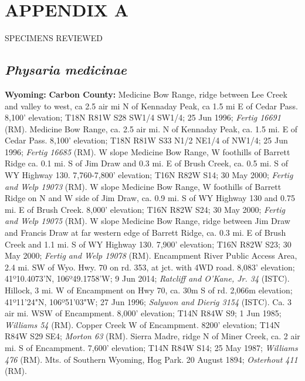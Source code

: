 \chapter*{APPENDIX A}
\begin{center}
SPECIMENS REVIEWED
\end{center}

\section*{\textit{Physaria medicinae}}

  \textbf{Wyoming:}
  \textbf{Carbon County:}
Medicine Bow Range, ridge between Lee Creek and valley to west, ca 2.5 air mi N
of Kennaday Peak, ca 1.5 mi E of Cedar Pass. 8,100' elevation; T18N R81W S28
SW1/4 SW1/4; 25 Jun 1996; \textit{Fertig 16691} (RM).
Medicine Bow Range, ca. 2.5 air mi. N of Kennaday Peak, ca. 1.5 mi. E of
Cedar Pass. 8,100’ elevation; T18N R81W S33 N1/2 NE1/4 of NW1/4; 25 Jun 1996;
\textit{Fertig 16685} (RM).
W slope Medicine Bow Range, W foothills of Barrett Ridge ca. 0.1 mi. S of
Jim Draw and 0.3 mi. E of Brush Creek, ca. 0.5 mi. S of WY Highway 130.
7,760-7,800’ elevation; T16N R82W S14; 30 May 2000;
\textit{Fertig and Welp 19073} (RM).
W slope Medicine Bow Range, W foothills of Barrett Ridge on N and W side of
Jim Draw, ca. 0.9 mi. S of WY Highway 130 and 0.75 mi. E of Brush Creek.
8,000’ elevation; T16N R82W S24; 30 May 2000;
\textit{Fertig and Welp 19075} (RM).
W slope Medicine Bow Range, ridge between Jim Draw and Francis Draw at far
western edge of Barrett Ridge, ca. 0.3 mi. E of Brush Creek and 1.1 mi. S of WY
Highway 130. 7,900’ elevation; T16N R82W S23; 30 May 2000;
\textit{Fertig and Welp 19078} (RM).
Encampment River Public Access Area, 2.4 mi. SW of Wyo. Hwy. 70 on rd. 353,
at jct. with 4WD road. 8,083' elevation; 41º10.4073'N, 106º49.1758'W;
9 Jun 2014; \textit{Ratcliff and O'Kane, Jr. 34} (ISTC).
Hillock, 3 mi. W of Encampment on Hwy 70, ca. 30m S of rd. 2,066m elevation;
41º11'24"N, 106º51'03"W; 27 Jun 1996; \textit{Salywon and Dierig 3154} (ISTC).
Ca. 3 air mi. WSW of Encampment. 8,000’ elevation; T14N R84W S9; 1 Jun 1985;
\textit{Williams 54} (RM).
Copper Creek W of Encampment. 8200’ elevation; T14N R84W S29 SE4;
\textit{Morton 63} (RM).
Sierra Madre, ridge N of Miner Creek, ca. 2 air mi. S of Encampment.
7,600’ elevation; T14N R84W S14; 25 May 1987; \textit{Williams 476} (RM).
Mts. of Southern Wyoming, Hog Park. 20 August 1894; \textit{Osterhout 411} (RM).
